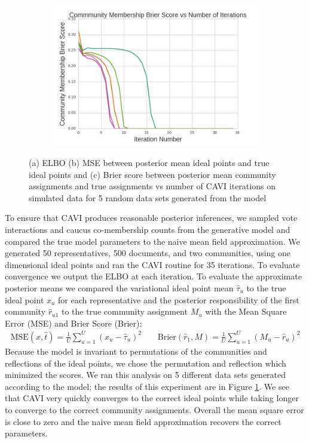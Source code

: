 \documentclass{article}
\begin{document}
\begin{figure}[h]
\begin{subfigure}[b]{0.3\textwidth}
        \caption{}
    \end{subfigure}
        \begin{subfigure}[b]{0.3\textwidth}
        \includegraphics[width=\textwidth]{toy_resp_mse.png}
        \caption{}
    \end{subfigure}
  \caption{(a) ELBO (b) MSE between posterior mean ideal points and true ideal points and (c) Brier score between posterior mean community assignments and true assignments vs number of CAVI iterations on simulated data for 5 random data sets generated from the model}
      \label{fig:toy_results}
\end{figure}

To ensure that CAVI produces reasonable posterior inferences, we sampled vote interactions and caucus co-membership counts from the generative model and compared the true model parameters to the naive mean field approximation. We generated 50 representatives, 500 documents, and two communities, using one dimensional ideal points and ran the CAVI routine for 35 iterations. To evaluate convergence we output the ELBO at each iteration. To evaluate the approximate posterior means we compared the variational ideal point mean $\hat{\tau}_u$ to the true ideal point $x_u$ for each representative and the posterior responsibility of the first community $\hat{r}_{u1}$ to the true community assignment $M_u$ with the Mean Square Error (MSE) and Brier Score (Brier):
\begin{align*}
 \text{MSE}(x, \hat{t}) = \frac{1}{U} \sum_{u=1}^U (x_u - \hat{\tau}_u) ^2  \;\; & \;\; \text{Brier}(\hat{r}_1, M) = \frac{1}{U} \sum_{u=1}^U (M_u - \hat{r}_u)^2
\end{align*}
Because the model is invariant to permutations of the communities and reflections of the ideal points, we chose the permutation and reflection which minimized the scores. We ran this analysis on 5 different data sets generated according to the model; the results of this experiment are in Figure \ref{fig:toy_results}. We see that CAVI very quickly converges to the correct ideal points while taking longer to converge to the correct community assignments. Overall the mean square error is close to zero and the naive mean field approximation recovers the correct parameters.
\end{document}
